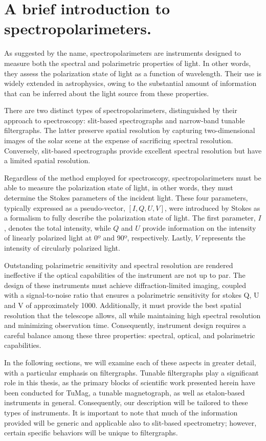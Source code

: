 \section{A brief introduction to spectropolarimeters.}

As suggested by the name, spectropolarimeters are instruments designed to measure both the spectral and polarimetric properties of light. In other words, they assess the polarization state of light as a function of wavelength. Their use is widely extended in astrophysics, owing to the substantial amount of information that can be inferred about the light source from these properties.

There are two distinct types of spectropolarimeters, distinguished by their approach to spectroscopy: slit-based spectrographs and narrow-band tunable filtergraphs. The latter preserve spatial resolution by capturing two-dimensional images of the solar scene at the expense of sacrificing spectral resolution. Conversely, slit-based spectrographs provide excellent spectral resolution but have a limited spatial resolution. 

Regardless of the method employed for spectroscopy, spectropolarimeters must be able to measure the polarization state of light, in other words, they must determine the Stokes parameters of the incident light. These four parameters, typically expressed as a pseudo-vector, $[I, Q, U, V]$, were introduced by Stokes \citep{Stokes_vector} as a formalism to fully describe the polarization state of light. The first parameter, $I$, denotes the total intensity, while $Q$ and $U$ provide information on the intensity of linearly polarized light at 0º and 90º, respectively. Lastly, $V$ represents the intensity of circularly polarized light.


Outstanding polarimetric sensitivity and spectral resolution are rendered ineffective if the optical capabilities of the instrument are not up to par. The design of these instruments must achieve diffraction-limited imaging, coupled with a signal-to-noise ratio that ensures a polarimetric sensitivity for stokes Q, U and V of approximately 1000. Additionally, it must provide the best spatial resolution that the telescope allows, all while maintaining high spectral resolution and minimizing observation time. Consequently, instrument design requires a careful balance among these three properties: spectral, optical, and polarimetric capabilities.

In the following sections, we will examine each of these aspects in greater detail, with a particular emphasis on filtergraphs. Tunable filtergraphs play a significant role in this thesis, as the primary blocks of scientific work presented herein have been conducted for TuMag, a tunable magnetograph, as well as etalon-based instruments in general. Consequently, our description will be tailored to these types of instruments. It is important to note that much of the information provided will be generic and applicable also to slit-based spectrometry; however, certain specific behaviors will be unique to filtergraphs.  

